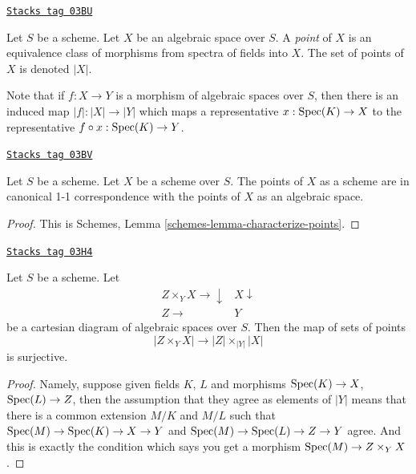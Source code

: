 \begin{definition}[Points]
\label{spaces-properties-definition-points}
\href{https://stacks.math.columbia.edu/tag/03BU}{\texttt{Stacks tag 03BU}}

Let $S$ be a scheme. Let $X$ be an algebraic space over $S$.
A {\it point} of $X$ is an equivalence class of morphisms
from spectra of fields into $X$.
The set of points of $X$ is denoted $|X|$.
\end{definition}

Note that if $f : X \to Y$ is a morphism of algebraic spaces
over $S$, then there is an induced map $|f| : |X| \to |Y|$ which
maps a representative $x : \operatorname{Spec}(K) \to X$ to the representative
$f \circ x : \operatorname{Spec}(K) \to Y$.

\begin{lemma}
\label{spaces-properties-lemma-scheme-points}
\href{https://stacks.math.columbia.edu/tag/03BV}{\texttt{Stacks tag 03BV}}

Let $S$ be a scheme. Let $X$ be a scheme over $S$.
The points of $X$ as a scheme are in canonical 1-1 correspondence
with the points of $X$ as an algebraic space.
\end{lemma}

\begin{proof}
This is Schemes, Lemma \ref{schemes-lemma-characterize-points}.
\end{proof}

\begin{lemma}
\label{spaces-properties-lemma-points-cartesian}
\href{https://stacks.math.columbia.edu/tag/03H4}{\texttt{Stacks tag 03H4}}

Let $S$ be a scheme. Let
$$
\begin{array}{cc}Z \times_Y X \longrightarrow\downarrow & X \downarrow \\ Z \longrightarrow & Y\end{array}
$$
be a cartesian diagram of algebraic spaces over $S$. Then the map of sets
of points
$$
|Z \times_Y X|
\longrightarrow
|Z| \times_{|Y|} |X|
$$
is surjective.
\end{lemma}

\begin{proof}
Namely, suppose given fields $K$, $L$ and morphisms
$\operatorname{Spec}(K) \to X$, $\operatorname{Spec}(L) \to Z$, then the
assumption that they agree as elements of $|Y|$ means that
there is a common extension $M/K$ and $M/L$
such that
$\operatorname{Spec}(M) \to \operatorname{Spec}(K) \to X \to Y$ and
$\operatorname{Spec}(M) \to \operatorname{Spec}(L) \to Z \to Y$ agree.
And this is exactly the condition which says you get a
morphism $\operatorname{Spec}(M) \to Z \times_Y X$.
\end{proof}

